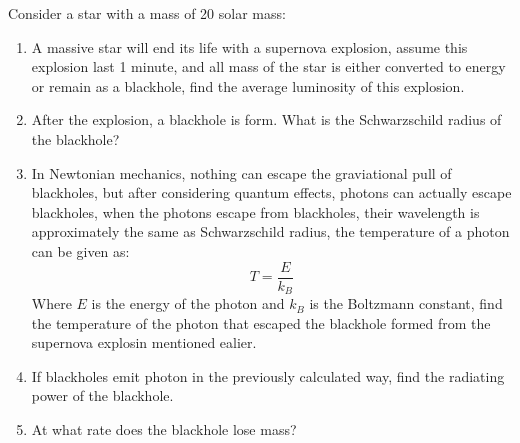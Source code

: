 \documentclass{article}
\numberwithin{equation}{section}
\begin{document}
Consider a star with a mass of 20 solar mass:

\begin{enumerate}
    \item A massive star will end its life with a supernova explosion, assume this explosion last 1 minute, and all mass of the star is either converted to energy or remain as a blackhole,
    find the average luminosity of this explosion.

    \item After the explosion, a blackhole is form. What is the Schwarzschild radius of the blackhole?
    
    \item In Newtonian mechanics, nothing can escape the graviational pull of blackholes, but after considering quantum effects, photons can actually escape blackholes,
    when the photons escape from blackholes, their wavelength is approximately the same as Schwarzschild radius, the temperature of a photon can be given as:
    \[
    T = \frac{E}{k_B}
    \]
    Where $E$ is the energy of the photon and $k_B$ is the Boltzmann constant, find the temperature of the photon that escaped the blackhole formed from the supernova explosin mentioned ealier.

    \item If blackholes emit photon in the previously calculated way, find the radiating power of the blackhole.

    \item At what rate does the blackhole lose mass?
\end{enumerate}
\end{document}
